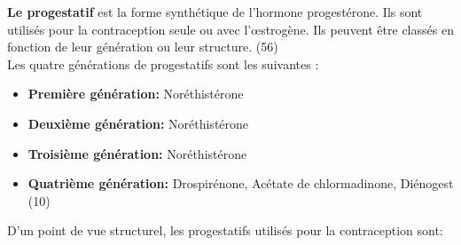 \noindent \textbf{Le progestatif} est la forme synthétique de l’hormone progestérone. Ils sont utilisés pour la contraception seule ou avec l’œstrogène. Ils peuvent être classés en fonction de leur génération ou leur structure. (56)\\

\noindent Les quatre générations de progestatifs sont les suivantes : 

\begin{itemize}[label={$\bullet$}, align=right]
  \item \textbf{Première génération:} Noréthistérone
  \item \textbf{Deuxième génération:} Noréthistérone
  \item \textbf{Troisième génération:} Noréthistérone
  \item \textbf{Quatrième génération:} Drospirénone, Acétate de chlormadinone, Diénogest (10)  
\end{itemize}

\noindent D’un point de vue structurel, les progestatifs utilisés pour la contraception sont: 

